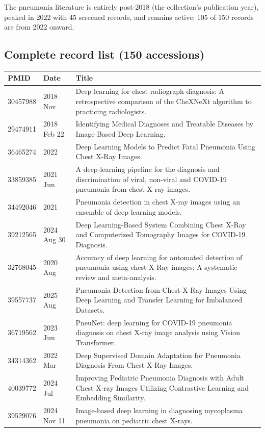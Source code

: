 The pneumonia literature is entirely post-2018 (the collection's publication year), peaked in 2022 with 45 screened records, and remains active; 105 of 150 records are from 2022 onward.\par

\subsection*{Complete record list (150 accessions)}
\begin{longtable}{llp{9.5cm}}
\hline
PMID & Date & Title \\
\hline
30457988 & 2018 Nov & Deep learning for chest radiograph diagnosis: A retrospective comparison of the CheXNeXt algorithm to practicing radiologists. \\
29474911 & 2018 Feb 22 & Identifying Medical Diagnoses and Treatable Diseases by Image-Based Deep Learning. \\
36465274 & 2022 & Deep Learning Models to Predict Fatal Pneumonia Using Chest X-Ray Images. \\
33859385 & 2021 Jun & A deep-learning pipeline for the diagnosis and discrimination of viral, non-viral and COVID-19 pneumonia from chest X-ray images. \\
34492046 & 2021 & Pneumonia detection in chest X-ray images using an ensemble of deep learning models. \\
39212565 & 2024 Aug 30 & Deep Learning-Based System Combining Chest X-Ray and Computerized Tomography Images for COVID-19 Diagnosis. \\
32768045 & 2020 Aug & Accuracy of deep learning for automated detection of pneumonia using chest X-Ray images: A systematic review and meta-analysis. \\
39557737 & 2025 Aug & Pneumonia Detection from Chest X-Ray Images Using Deep Learning and Transfer Learning for Imbalanced Datasets. \\
36719562 & 2023 Jun & PneuNet: deep learning for COVID-19 pneumonia diagnosis on chest X-ray image analysis using Vision Transformer. \\
34314362 & 2022 Mar & Deep Supervised Domain Adaptation for Pneumonia Diagnosis From Chest X-Ray Images. \\
40039772 & 2024 Jul & Improving Pediatric Pneumonia Diagnosis with Adult Chest X-ray Images Utilizing Contrastive Learning and Embedding Similarity. \\
39529076 & 2024 Nov 11 & Image-based deep learning in diagnosing mycoplasma pneumonia on pediatric chest X-rays. \\

\end{longtable}

